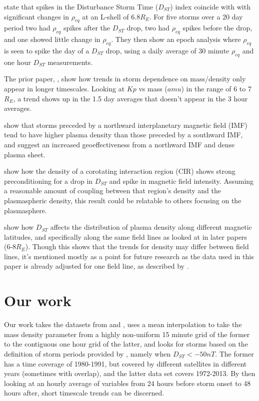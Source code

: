 \documentclass[10pt,twocolumn]{article}
\begin{document}
\cite{Takahashi2010} state that spikes in the Disturbance Storm Time ($D_{ST}$) index coincide with with significant changes in $\rho_{eq}$ at an L-shell of 6.8$R_E$. For five storms over a 20 day period two had $\rho_{eq}$ spikes after the $D_{ST}$ drop, two had $\rho_{eq}$ spikes before the drop, and one showed little change in $\rho_{eq}$. They then show an epoch analysis where $\rho_{eq}$ is seen to spike the day of a $D_{ST}$ drop, using a daily average of 30 minute $\rho_{eq}$ and one hour $D_{ST}$ measurements. 

The prior paper, \cite{Takahashi2006}, show how trends in storm dependence on mass/density only appear in longer timescales. Looking at $Kp$ vs mass ($amu$) in the range of 6 to 7 $R_E$, a trend shows up in the 1.5 day averages that doesn't appear in the 3 hour averages.

\cite{Lavraud2006} show that storms preceded by a northward interplanetary magnetic field (IMF) tend to have higher plasma density than those preceded by a southward IMF, and suggest an increased geoeffectiveness from a northward IMF and dense plasma sheet.

\cite{Tsurutani1997} show how the density of a corotating interaction region (CIR) shows strong preconditioning for a drop in $D_{ST}$ and spike in magnetic field intensity. Assuming a reasonable amount of coupling between that region's density and the plasmaspheric density, this result could be relatable to others focusing on the plasmasphere. 

\cite{Denton2006} show how $D_{ST}$ affects the distribution of plasma density along different magnetic latitudes, and specifically along the same field lines as looked at in later papers (6-8$R_E$). Though this shows that the trends for density may differ between field lines, it's mentioned mostly as a point for future research as the data used in this paper is already adjusted for one field line, as described by \cite{Takahashi2010}.



\section{Our work}
Our work takes the datasets from \cite{Denton} and \cite{Reconstruction}, uses a mean interpolation to take the mass density parameter from a highly non-uniform 15 minute grid of the former to the contiguous one hour grid of the latter, and looks for storms based on the definition of storm periods provided by \cite{Takahashi2010}, namely when $D_{ST}<-50nT$. The former has a time coverage of 1980-1991, but covered by different satellites in different years (sometimes with overlap), and the latter data set covers 1972-2013. By then looking at an hourly average of variables from 24 hours before storm onset to 48 hours after, short timescale trends can be discerned. 
\end{document}
